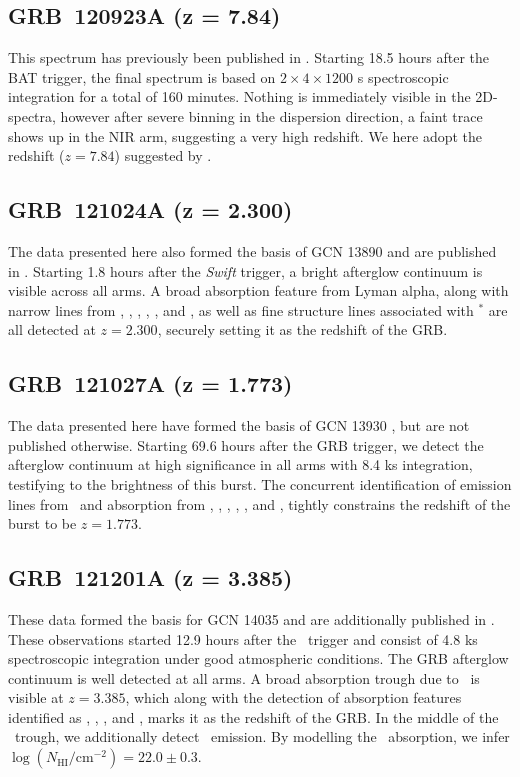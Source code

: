 \documentclass[longauth]{aa}    %
\begin{document}
\subsection{GRB~120923A (z = 7.84)} \label{120923}

This spectrum has previously been published in \citet{Tanvir2017a}. Starting
18.5 hours after the BAT trigger, the final spectrum is based on $2 \times 4
\times 1200$ s spectroscopic integration for a total of 160 minutes. Nothing is
immediately visible in the 2D-spectra, however after severe binning in the
dispersion direction, a faint trace shows up in the NIR arm, suggesting a very
high redshift. We here adopt the redshift ($z = 7.84$) suggested by
\citet{Tanvir2017a}.

\subsection{GRB~121024A (z = 2.300)} \label{121024}

The data presented here also formed the basis of GCN 13890 \citep{GCN13890} and
are published in \citet{Friis2015}. Starting 1.8 hours after the
\textit{Swift} trigger, a bright afterglow continuum is visible across all arms.
A broad absorption feature from Lyman alpha, along with narrow lines from \civ,
\SIii, \SIiv, \feii, \sii, and \alii, as well as fine structure lines associated
with \SIii$^*$ are all detected at $z = 2.300$, securely setting it as the
redshift of the GRB.

\subsection{GRB~121027A (z = 1.773)} \label{121027}

The data presented here have formed the basis of GCN 13930 \citep{GCN13930}, but
are not published otherwise. Starting 69.6 hours after the GRB trigger, we detect
the afterglow continuum at high significance in all arms with 8.4 ks
integration, testifying to the brightness of this burst. The concurrent
identification of emission lines from \oiii~and absorption from \civ, \alii,
\aliii, \mgi, \mgii, and \feii, tightly constrains the redshift of the burst to
be $z = 1.773$.

\subsection{GRB~121201A (z = 3.385)} \label{121201}

These data formed the basis for GCN 14035 \citep{GCN14035} and are additionally
published in \citet{Kruhler2015}. These observations started 12.9 hours after
the \swift~trigger and consist of 4.8 ks spectroscopic integration under good
atmospheric conditions. The GRB afterglow continuum is well detected at all
arms. A broad absorption trough due to \lya~is visible at $z = 3.385$, which
along with the detection of absorption features identified as \SIiv, \civ,
\alii, and \aliii, marks it as the redshift of the GRB. In the middle of the
\lya~trough, we additionally detect \lya~emission. By modelling the
\lya~absorption, we infer $\log (N_{\mathrm{HI}}/\mathrm{cm}^{-2}) = 22.0 \pm
0.3$.
\end{document}
